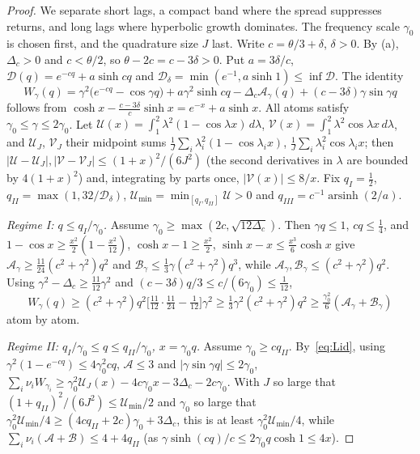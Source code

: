 \documentclass[11pt]{article}
\theoremstyle{definition}
\theoremstyle{remark}
\newcommand{\cA}{\mathcal A}
\newcommand{\cB}{\mathcal B}
\newcommand{\ch}{\cosh}
\newcommand{\sh}{\sinh}
\newcommand{\arsinh}{\operatorname{arsinh}}
\begin{document}
\begin{proof}
We separate short lags, a compact band where the spread suppresses
returns, and long lags where hyperbolic growth dominates.  The frequency
scale \(\gamma_0\) is chosen first, and the quadrature size \(J\) last.
Write \(c=\theta/3+\delta\), \(\delta>0\).  By (a), \(\Delta_c>0\) and \(c<\theta/2\), so
\(\theta-2c=c-3\delta>0\).  Put \(a=3\delta/c\), \(\mathcal D(q)=e^{-cq}+a\sh cq\) and
\(\mathcal D_\delta=\min(e^{-1},a\sh1)\le\inf \mathcal D\).  The identity
\begin{equation}\label{eq:Lid}
W_\gamma(q)=\gamma^2\bigl(e^{-cq}-\cos\gamma q\bigr)+a\gamma^2\sh cq-\Delta_c\cA_\gamma(q)+(c-3\delta)\gamma\sin\gamma q
\end{equation}
follows from \(\ch x-\frac{c-3\delta}c\sh x=e^{-x}+a\sh x\).  All atoms satisfy
\(\gamma_0\le\gamma\le2\gamma_0\).  Let \(\mathcal U(x)=\int_1^2\lambda^2(1-\cos\lambda x)\,d\lambda\),
\(\mathcal V(x)=\int_1^2\lambda^2\cos\lambda x\,d\lambda\), and \(\mathcal U_J\), \(\mathcal V_J\) their midpoint sums
\(\frac1J\sum_i\lambda_i^2(1-\cos\lambda_ix)\), \(\frac1J\sum_i\lambda_i^2\cos\lambda_ix\); then
\(|\mathcal U-\mathcal U_J|,|\mathcal V-\mathcal V_J|\le(1+x)^2/(6J^2)\) (the second derivatives in \(\lambda\) are bounded
by \(4(1+x)^2\)) and, integrating by parts once, \(|\mathcal V(x)|\le8/x\).  Fix
\(q_I=\frac12\), \(q_{II}=\max(1,32/\mathcal D_\delta)\), \(\mathcal U_{\min}=\min_{[q_I,q_{II}]}\mathcal U>0\) and
\(q_{III}=c^{-1}\arsinh(2/a)\).

\emph{Regime I: \(q\le q_I/\gamma_0\).}  Assume \(\gamma_0\ge\max(2c,\sqrt{12\Delta_c})\).  Then
\(\gamma q\le1\), \(cq\le\frac14\), and \(1-\cos x\ge\frac{x^2}2(1-\frac{x^2}{12})\),
\(\ch x-1\ge\frac{x^2}2\), \(\sh x-x\le\frac{x^3}6\ch x\) give
\(\cA_\gamma\ge\frac{11}{24}(c^2+\gamma^2)q^2\) and
\(\cB_\gamma\le\frac13\gamma(c^2+\gamma^2)q^3\), while \(\cA_\gamma,\cB_\gamma\le(c^2+\gamma^2)q^2\).  Using
\(\gamma^2-\Delta_c\ge\frac{11}{12}\gamma^2\) and \((c-3\delta)q/3\le c/(6\gamma_0)\le\frac1{12}\),
\[
W_\gamma(q)\ge(c^2+\gamma^2)q^2\bigl[\tfrac{11}{12}\cdot\tfrac{11}{24}-\tfrac1{12}\bigr]\gamma^2
\ge\tfrac13\gamma^2(c^2+\gamma^2)q^2\ge\tfrac{\gamma_0^2}6(\cA_\gamma+\cB_\gamma)
\]
atom by atom.

\emph{Regime II: \(q_I/\gamma_0\le q\le q_{II}/\gamma_0\), \(x=\gamma_0 q\).}  Assume \(\gamma_0\ge cq_{II}\).
By~\eqref{eq:Lid}, using \(\gamma^2(1-e^{-cq})\le4\gamma_0^2cq\), \(\cA\le3\) and
\(|\gamma\sin\gamma q|\le2\gamma_0\),
\(\sum_i\nu_iW_{\gamma_i}\ge \gamma_0^2\mathcal U_J(x)-4c\gamma_0x-3\Delta_c-2c\gamma_0\).  With \(J\) so large
that \((1+q_{II})^2/(6J^2)\le \mathcal U_{\min}/2\) and \(\gamma_0\) so large that
\(\gamma_0^2\mathcal U_{\min}/4\ge(4cq_{II}+2c)\gamma_0+3\Delta_c\), this is at least \(\gamma_0^2\mathcal U_{\min}/4\), while
\(\sum_i\nu_i(\cA+\cB)\le4+4q_{II}\) (as \(\gamma\sh(cq)/c\le2\gamma_0 q\ch1\le4x\)).


\end{proof}
\end{document}
